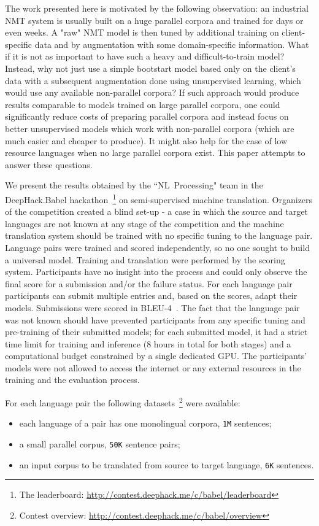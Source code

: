 \documentclass[]{article}
\begin{document}
The work presented here is motivated by the following observation: an industrial \ac{NMT} system is usually built on a huge parallel corpora and trained for days or even weeks.
A "raw" \ac{NMT} model is then tuned by additional training on client-specific data and by augmentation with some domain-specific information.
What if it is not as important to have such a heavy and difficult-to-train model?
Instead, why not just use a simple bootstart model based only on the client's data with a subsequent augmentation done using unsupervised learning, which would use any available non-parallel corpora?
If such approach would produce results comparable to models trained on large parallel corpora, one could significantly reduce costs of preparing parallel corpora and instead focus on better unsupervised models which work with non-parallel corpora (which are much easier and cheaper to produce).
It might also help for the case of low resource languages when no large parallel corpora exist.
This paper attempts to answer these questions.

We present the results obtained by the ``NL~Processing" team in the DeepHack.Babel hackathon~\footnote{The leaderboard: \url{http://contest.deephack.me/c/babel/leaderboard}} on semi-supervised machine translation.
Organizers of the competition created a blind set-up - a case in which the source and target languages are not known at any stage of the competition and the machine translation system should be trained with no specific tuning to the language pair.
Language pairs were trained and scored independently, so no one sought to build a universal model.
Training and translation were performed by the scoring system.
Participants have no insight into the process and could only observe the final score for a submission and/or the failure status.
For each language pair participants can submit multiple entries and, based on the scores, adapt their models.
Submissions were scored in BLEU-4~\citep{papineni2002bleu}.
The fact that the language pair was not known should have prevented participants from any specific tuning and pre-training of their submitted models; for each submitted model, it had a strict time limit for training and inference (8 hours in total for both stages) and a computational budget constrained by a single dedicated GPU.
The participants' models were not allowed to access the internet or any external resources in the training and the evaluation process.

For each language pair the following datasets~\footnote{Contest overview: \url{http://contest.deephack.me/c/babel/overview}} were available:
\begin{itemize}
  \item each language of a pair has one monolingual corpora, {\tt 1M} sentences;
  \item a small parallel corpus, {\tt 50K} sentence pairs;
  \item an input corpus to be translated from source to target language, {\tt 6K} sentences.
\end{itemize}
\end{document}
